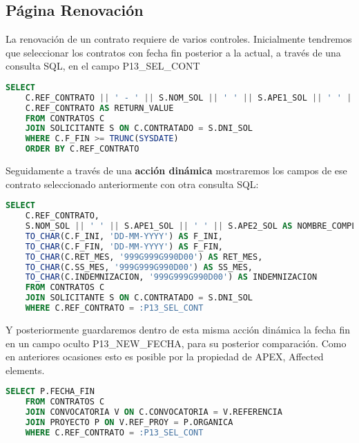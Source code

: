 \subsection{Página Renovación}
La renovación de un contrato requiere de varios controles. Inicialmente tendremos que seleccionar los contratos con fecha fin posterior a la actual,  a través de una consulta \acrshort{SQL}, en el campo P13\_SEL\_CONT
\begin{lstlisting}[language=SQL, caption={Selección de contratos abiertos}]
	SELECT 
	C.REF_CONTRATO || ' - ' || S.NOM_SOL || ' ' || S.APE1_SOL || ' ' || S.APE2_SOL AS DISPLAY_VALUE,
	C.REF_CONTRATO AS RETURN_VALUE
	FROM CONTRATOS C
	JOIN SOLICITANTE S ON C.CONTRATADO = S.DNI_SOL
	WHERE C.F_FIN >= TRUNC(SYSDATE)
	ORDER BY C.REF_CONTRATO
\end{lstlisting}
Seguidamente a través de una \textbf{acción dinámica} mostraremos los campos de ese contrato seleccionado anteriormente con otra consulta \acrshort{SQL}:
\begin{lstlisting}[language=SQL, caption={Obtención de datos del contrato a renovar}]
	SELECT 
	C.REF_CONTRATO,
	S.NOM_SOL || ' ' || S.APE1_SOL || ' ' || S.APE2_SOL AS NOMBRE_COMPLETO,
	TO_CHAR(C.F_INI, 'DD-MM-YYYY') AS F_INI,
	TO_CHAR(C.F_FIN, 'DD-MM-YYYY') AS F_FIN,
	TO_CHAR(C.RET_MES, '999G999G990D00') AS RET_MES,
	TO_CHAR(C.SS_MES, '999G999G990D00') AS SS_MES,
	TO_CHAR(C.INDEMNIZACION, '999G999G990D00') AS INDEMNIZACION
	FROM CONTRATOS C
	JOIN SOLICITANTE S ON C.CONTRATADO = S.DNI_SOL
	WHERE C.REF_CONTRATO = :P13_SEL_CONT
\end{lstlisting}
Y posteriormente guardaremos dentro de esta misma acción dinámica la fecha fin en un campo oculto P13\_NEW\_FECHA, para su posterior comparación. Como en anteriores ocasiones esto es posible por la propiedad de \acrshort{APEX}, Affected elements.
\begin{lstlisting}[language=SQL, caption={Obtención de fecha fin del contrato a renovar}]
	SELECT P.FECHA_FIN
	FROM CONTRATOS C
	JOIN CONVOCATORIA V ON C.CONVOCATORIA = V.REFERENCIA
	JOIN PROYECTO P ON V.REF_PROY = P.ORGANICA
	WHERE C.REF_CONTRATO = :P13_SEL_CONT
\end{lstlisting}

